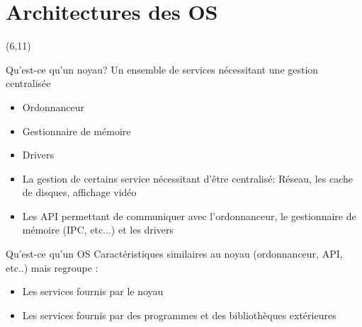 \part{Architectures des OS}

{
\begin{frame}[plain]
  \partpage
  \begin{textblock}{10}(6,11)
    \begin{quote}
      \rmfamily\textit\textbf\color{darkgray}{\large
        ``Why do programmers always mix up Halloween and Christmas?\\
        Because Oct 31 equals Dec 25.''}
    \end{quote}
  \end{textblock}
\end{frame}
}


\begin{frame}[fragile=singleslide]{Qu'est-ce qu'un noyau?}
  Un ensemble de services nécessitant une gestion centralisée
  \begin{itemize}
  \item Ordonnanceur
  \item Gestionnaire de mémoire
  \item Drivers
  \item La gestion de  certains service nécessitant d'être centralisé:
    Réseau, les cache de disques, affichage vidéo
  \item  Les API  permettant  de communiquer  avec l'ordonnanceur,  le
    gestionnaire de mémoire (IPC, etc...) et les drivers
  \end{itemize}
\end{frame}

\begin{frame}[fragile=singleslide]{Qu'est-ce qu'un OS}
  Caractéristiques similaires au noyau (ordonnanceur, API, etc..) mais
  regroupe :
  \begin{itemize}
  \item Les services fournis par le noyau
  \item Les  services fournis par des programmes  et des bibliothèques
    extérieures
  \end{itemize}
\end{frame}

